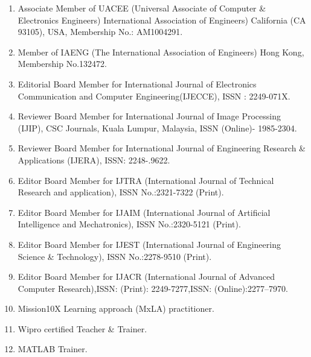 %
%
%


\begin{enumerate}
	

	\item Associate Member of UACEE (Universal Associate of Computer \& Electronics Engineers) International Association of Engineers) California (CA 93105), USA, Membership No.: AM1004291.
	
	\item Member of IAENG (The International Association of Engineers) Hong Kong, Membership No.132472.
	
	\item Editorial Board Member for International Journal of Electronics Communication and Computer Engineering(IJECCE), ISSN : 2249-071X.
	
	\item Reviewer Board Member for International Journal of Image Processing (IJIP), CSC Journals, Kuala Lumpur, Malaysia, ISSN (Online)- 1985-2304.
	
	\item Reviewer Board Member for International Journal of Engineering Research \& Applications (IJERA), ISSN: 2248-.9622.
	
	\item Editor Board Member for IJTRA (International Journal of Technical Research and application), ISSN No.:2321-7322 (Print).
	
	\item Editor Board Member for IJAIM (International Journal of Artificial Intelligence and Mechatronics), ISSN No.:2320-5121 (Print).
	
	\item Editor Board Member for IJEST (International Journal of Engineering Science \& Technology), ISSN No.:2278-9510 (Print).
	
	\item Editor Board Member for IJACR (International Journal of Advanced Computer Research),ISSN: (Print): 2249-7277,ISSN: (Online):2277–7970.
	
	\item Mission10X Learning approach (MxLA) practitioner.
	
	\item Wipro certified Teacher \& Trainer.
	\item MATLAB Trainer.

\end{enumerate}

